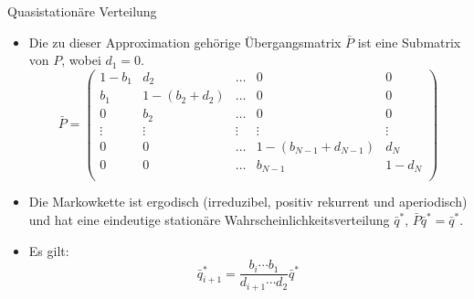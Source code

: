 \documentclass{beamer}
\begin{document}
\begin{frame}{Quasistationäre Verteilung}
  \begin{itemize}
  \item Die zu dieser Approximation gehörige Übergangsmatrix $\bar{P}$ ist eine Submatrix von $P$, wobei $d_1 = 0$.
      \[
      \bar{P} = \begin{pmatrix}
        1-b_1 & d_2 & \dots & 0 & 0 \\
        b_1 & 1 - (b_2 + d_2) &  \dots & 0 & 0 \\
        0 & b_2 & \dots & 0 & 0 \\
        \vdots & \vdots & \vdots & \vdots & \vdots \\
        0 & 0  &  \dots & 1 - (b_{N-1} + d_{N-1}) & d_N \\
        0 & 0  &  \dots & b_{N-1} & 1 - d_N \\
      \end{pmatrix}
    \]
  \item Die Markowkette ist ergodisch (irreduzibel, positiv rekurrent und aperiodisch) und hat eine eindeutige stationäre Wahrscheinlichkeitsverteilung $\bar{q}^*$, $\bar{P}\bar{q}^* = \bar{q}^*$.
  \item Es gilt:
    \[
      \bar{q}^*_{i+1} = \frac{b_i \cdots b_1}{d_{i+1}\cdots d_2}\bar{q}^*
    \]
  \end{itemize}
\end{frame}
\end{document}
